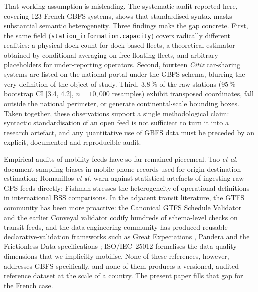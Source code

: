 \documentclass[11pt,a4paper]{article}
\begin{document}
That working assumption is misleading. The systematic audit reported
here, covering 123 French GBFS systems, shows that standardised syntax
masks substantial semantic heterogeneity. Three findings make the gap
concrete. First, the same field
(\texttt{station\_information.capacity}) covers radically different
realities: a physical dock count for dock-based fleets, a theoretical
estimator obtained by conditional averaging on free-floating fleets, and
arbitrary placeholders for under-reporting operators. Second, fourteen
\emph{Citiz} car-sharing systems are listed on the national portal under
the GBFS schema, blurring the very definition of the object of study.
Third, $3.8\,\%$ of the raw stations (95\,\% bootstrap CI [3.4, 4.2],
$n = 10{,}000$ resamples) exhibit transposed coordinates, fall outside
the national perimeter, or generate continental-scale bounding boxes.
Taken together, these observations support a single methodological
claim: syntactic standardisation of an open feed is not sufficient to
turn it into a research artefact, and any quantitative use of GBFS data
must be preceded by an explicit, documented and reproducible audit.

Empirical audits of mobility feeds have so far remained piecemeal. Tao
\textit{et al.} \cite{Tao2020} document sampling biases in mobile-phone
records used for origin-destination estimation; Romanillos \textit{et
al.} \cite{Romanillos2016} warn against statistical artefacts of
ingesting raw GPS feeds directly; Fishman \cite{Fishman2016} stresses
the heterogeneity of operational definitions in international BSS
comparisons. In the adjacent transit literature, the GTFS community has
been more proactive: the Canonical GTFS Schedule Validator
\cite{MobilityData2024Validator} and the earlier Conveyal validator
\cite{Antrim2013Conveyal} codify hundreds of schema-level checks on
transit feeds, and the data-engineering community has produced reusable
declarative-validation frameworks such as Great Expectations
\cite{GreatExpectations2024}, Pandera \cite{Pandera2024} and the
Frictionless Data specifications \cite{FrictionlessData2023};
ISO/IEC~25012 \cite{ISO25012} formalises the data-quality dimensions
that we implicitly mobilise. None of these references, however,
addresses GBFS specifically, and none of them produces a versioned,
audited reference dataset at the scale of a country. The present paper
fills that gap for the French case.
\end{document}

